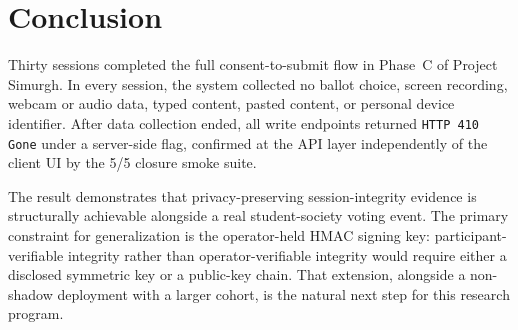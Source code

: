 \documentclass[conference]{IEEEtran}
\newcommand{\sys}{Project Simurgh}
\begin{document}
\section{Conclusion}

Thirty sessions completed the full consent-to-submit flow in Phase~C of
\sys{}. In every session, the system collected no ballot choice, screen
recording, webcam or audio data, typed content, pasted content, or personal
device identifier. After data collection ended, all write endpoints returned
\texttt{HTTP~410 Gone} under a server-side flag, confirmed at the API layer
independently of the client UI by the 5/5 closure smoke suite.

The result demonstrates that privacy-preserving session-integrity evidence is
structurally achievable alongside a real student-society voting event. The
primary constraint for generalization is the operator-held HMAC signing
key: participant-verifiable integrity rather than operator-verifiable
integrity would require either a disclosed symmetric key or a public-key chain.
That extension, alongside a non-shadow deployment with a larger cohort, is the
natural next step for this research program.



\end{document}
